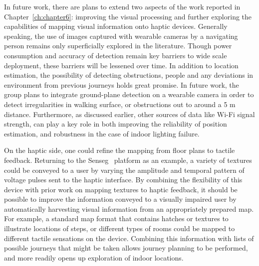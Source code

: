 In future work, there are plans to extend two aspects of the work reported in Chapter~\ref{ch:chapter6}: improving the visual processing and further exploring the capabilities of mapping visual information onto haptic devices. Generally speaking, the use of images captured with wearable cameras by a navigating person remains only superficially explored in the literature. Though power consumption and accuracy of detection remain key barriers to wide scale deployment, these barriers will be lessened over time. In addition to location estimation, the possibility of detecting obstructions, people and any deviations in environment from previous journeys holds great promise. In future work, the group plans to integrate ground-plane detection on a wearable camera in order to detect irregularities in walking surface, or obstructions out to around a 5 m distance. Furthermore, as discussed earlier, other sources of data like Wi-Fi signal strength, can play a key role in both improving the reliability of position estimation, and robustness in the case of indoor lighting failure.

On the haptic side, one could refine the mapping from floor plans to tactile feedback. Returning to the Senseg\texttrademark~ platform as an example, a variety of textures could be conveyed to a user by varying the amplitude and temporal pattern of voltage pulses sent to the haptic interface. By combining the flexibility of this device with prior work on mapping textures to haptic feedback, it should be possible to improve the information conveyed to a visually impaired user by automatically harvesting visual information from an appropriately prepared map. For example, a standard map format that contains hatches or textures to illustrate locations of steps, or different types of rooms could be mapped to different tactile sensations on the device. Combining this information with lists of possible journeys that might be taken allows journey planning to be performed, and more readily opens up exploration of indoor locations.



